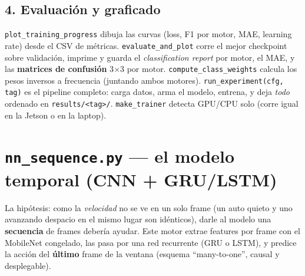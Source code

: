 \documentclass[11pt,a4paper]{article}
\newcommand{\code}[1]{\lstinline[basicstyle=\ttfamily\normalsize]|#1|}
\begin{document}
\subsection*{4. Evaluación y graficado}
\code{plot_training_progress} dibuja las curvas (loss, F1 por motor, MAE, learning rate) desde el CSV de
métricas. \code{evaluate_and_plot} corre el mejor checkpoint sobre validación, imprime y guarda el
\emph{classification report} por motor, el MAE, y las \textbf{matrices de confusión} 3$\times$3 por motor.
\code{compute_class_weights} calcula los pesos inversos a frecuencia (juntando ambos motores).
\code{run_experiment(cfg, tag)} es el pipeline completo: carga datos, arma el modelo, entrena, y deja
\emph{todo} ordenado en \code{results/<tag>/}. \code{make_trainer} detecta GPU/CPU solo (corre igual en la
Jetson o en la laptop).

\section{\texttt{nn\_sequence.py} --- el modelo temporal (CNN + GRU/LSTM)}
La hipótesis: como la \emph{velocidad} no se ve en un solo frame (un auto quieto y uno avanzando despacio en
el mismo lugar son idénticos), darle al modelo una \textbf{secuencia} de frames debería ayudar. Este motor
extrae features por frame con el MobileNet congelado, las pasa por una red recurrente (GRU o LSTM), y predice
la acción del \textbf{último} frame de la ventana (esquema ``many-to-one'', causal y desplegable).


\end{document}
